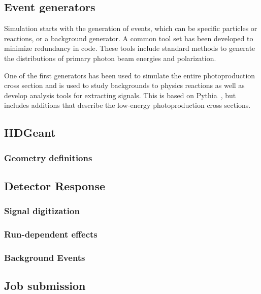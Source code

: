 \subsection{Event generators \label{sec:generators}}
Simulation starts with the generation of events, which can be specific particles or reactions, or a background generator. A common tool set has been developed to minimize redundancy in code. These tools include standard methods to generate the distributions of primary photon beam energies and polarization.

One of the first generators has been used to simulate the entire photoproduction cross section and is used to study backgrounds to physics reactions as well as develop analysis tools for extracting signals. This is based on Pythia~\cite{Sjostrand:2006za}, but includes additions that describe the low-energy photoproduction cross sections. 


\subsection{HDGeant \label{sec:hdgeant}}

\subsubsection[Material thickness]{\label{sec:materialscan}Geometry definitions}


\subsection[mcsmear]{Detector Response}
\subsubsection{Signal digitization}
\subsubsection{Run-dependent effects}
\subsubsection{Background Events}

\subsection{Job submission \label{sec:jobsubmission}}
